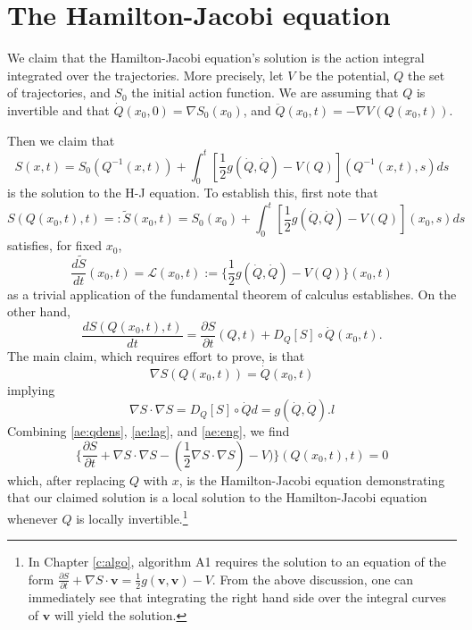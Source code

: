 \documentclass[11pt]{article}
\theoremstyle{remark}
\begin{document}
\section{The {H}amilton-{J}acobi equation}

We claim that the Hamilton-Jacobi equation's solution is the action
integral integrated over the trajectories. More precisely, let $V$ be
the potential, $Q$ the set of trajectories, and $S_0$ the initial
action function.  We are assuming that $Q$ is invertible and that
$\dot{Q} (x_0,0) = \nabla S_0 (x_0)$, and $\ddot Q (x_0,t) =
-\nabla V (Q (x_0,t))$. 

Then we claim
that 
\begin{equation} \label{ae:sdef}
S(x,t) = S_0(Q^{-1}(x,t)) + \int_0^t [\frac{1}{2} g(\dot Q, \dot Q) - V
(Q)](Q^{-1}(x, t), s) ds    
\end{equation} 
is the solution to the H-J equation. To establish this, first note
that 
\[
S(Q(x_0,t),t) \ensuremath{=:} \tilde{S} (x_0,t) = S_0(x_0) + \int_0^t
[\frac{1}{2} g(\dot Q, \dot Q) - V 
(Q)](x_0, s) ds    
\] 
satisfies, for fixed $x_0$,    
\begin{equation} \label{ae:lag}
\ensuremath{\frac{d{\tilde{S}}}{d{t}}} (x_0,t) = \ensuremath{\mathcal{L}}(x_0,t) := 
\{\frac{1}{2} g(\dot Q, \dot Q) - V(Q)\}(x_0,t)
\end{equation}
as a trivial application of the fundamental theorem of calculus
establishes.
On the other hand, 
\begin{equation} \label{ae:eng}
\ensuremath{\frac{d{S(Q(x_0,t),t)}}{d{t}}} = \ensuremath{\frac{\partial {S}}{\partial {t}}} (Q, t) + D_Q [S] \circ
\dot{Q}({x_0,t})  .
\end{equation}
The main claim, which requires effort to prove, is that 
\begin{equation} \label{ae:claim} 
\nabla S (Q (x_0,t)) = \dot{Q}(x_0,t)
\end{equation} 
implying 
\begin{equation}\label{ae:qdens}
\nabla S \cdot \nabla S 
= D_Q [S] \circ\dot{Q} d 
= g(\dot{Q}, \dot{Q} ).  l
\end{equation} 
Combining \eqref{ae:qdens}, \eqref{ae:lag}, and \eqref{ae:eng}, we find
\[
\{\ensuremath{\frac{\partial {S}}{\partial {t}}}  + \nabla S \cdot \nabla S 
 - (\frac{1}{2} \nabla S \cdot \nabla S) - V) \}(Q(x_0,t),t)  = 0
\]
which, after replacing $Q$ with $x$, is the Hamilton-Jacobi
equation demonstrating that our claimed solution is 
 a local solution to the
Hamilton-Jacobi equation whenever $Q$ is locally
invertible.\footnote{In Chapter \ref{c:algo}, algorithm A1 requires
  the solution to an equation of the form 
$\ensuremath{\frac{\partial {S}}{\partial {t}}} + \nabla S \cdot \boldsymbol{v} = \frac{1}{2} g(\boldsymbol{v}, \boldsymbol{v})  -
V$. From the above discussion, one can immediately see that
integrating the right hand side over the integral curves of $\boldsymbol{v}$
will yield the solution.}
\end{document}
